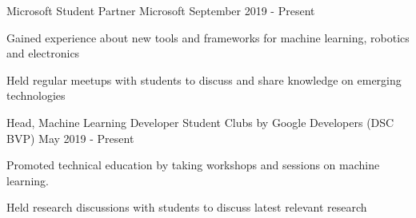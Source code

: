 
\smallskip
\begin{cventries}

  \cventry
    {Microsoft Student Partner} %
    {Microsoft} %
    {} %
    {September 2019 - Present} %
    {
      \begin{cvitems} %
        \item {Gained experience about new tools and frameworks for machine learning, robotics and electronics}
        \item {Held regular meetups with students to discuss and share knowledge on emerging technologies}
      \end{cvitems}
    }
  \cventry
    {Head, Machine Learning} %
    {Developer Student Clubs by Google Developers (DSC BVP)} %
    {} %
    {May 2019 - Present} %
    {
      \begin{cvitems} %
        \item {Promoted technical education by taking workshops and sessions on machine learning.}
        \item {Held research discussions with students to discuss latest relevant research}
      \end{cvitems}
    }
    \smallskip
    

\end{cventries}
